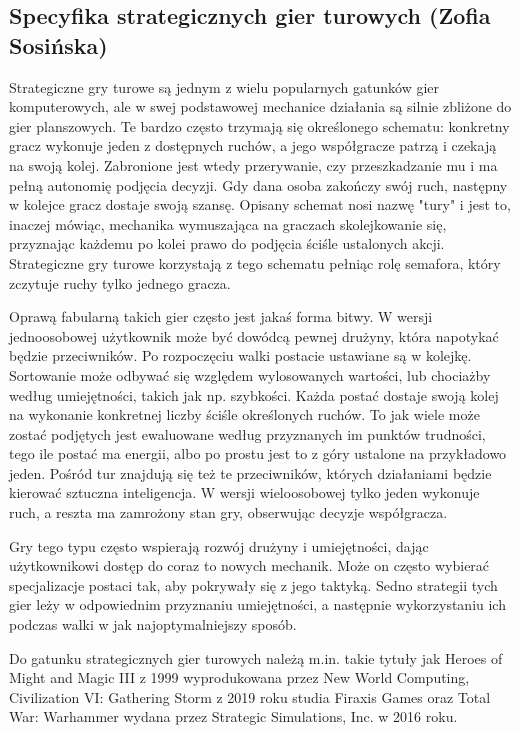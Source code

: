 \subsection{Specyfika strategicznych gier turowych (Zofia Sosińska)}\label{ss:tbs}
Strategiczne gry turowe są jednym z wielu popularnych gatunków gier komputerowych, ale w swej podstawowej mechanice działania są silnie zbliżone do
gier planszowych. Te bardzo często trzymają się określonego schematu: konkretny gracz wykonuje jeden z dostępnych ruchów, a jego współgracze patrzą i czekają 
na swoją kolej. Zabronione jest wtedy przerywanie, czy przeszkadzanie mu i ma pełną autonomię podjęcia decyzji. Gdy dana osoba zakończy swój ruch, następny w kolejce gracz
dostaje swoją szansę. Opisany schemat nosi nazwę "tury" i jest to, inaczej mówiąc, mechanika wymuszająca na graczach skolejkowanie się, przyznając każdemu po kolei
prawo do podjęcia ściśle ustalonych akcji. Strategiczne gry turowe korzystają z tego schematu pełniąc rolę semafora, który zczytuje ruchy tylko jednego gracza.

Oprawą fabularną takich gier często jest jakaś forma bitwy. W wersji jednoosobowej użytkownik może być dowódcą pewnej drużyny, która napotykać będzie przeciwników. Po 
rozpoczęciu walki postacie ustawiane są w kolejkę. Sortowanie może odbywać się względem wylosowanych wartości, lub chociażby według umiejętności, takich jak np. szybkości. Każda postać
 dostaje swoją kolej na wykonanie konkretnej liczby ściśle określonych ruchów. To jak wiele może zostać podjętych jest ewaluowane według przyznanych im punktów 
 trudności, tego ile postać ma energii, albo po prostu jest to z góry ustalone na przykładowo jeden. Pośród tur znajdują się też te przeciwników, których działaniami będzie 
 kierować sztuczna inteligencja. W wersji wieloosobowej tylko jeden wykonuje ruch, a reszta ma zamrożony stan gry, obserwując decyzje współgracza.

Gry tego typu często wspierają rozwój drużyny i umiejętności, dając użytkownikowi dostęp do coraz to nowych mechanik. Może on często wybierać specjalizacje postaci tak, aby 
pokrywały się z jego taktyką. Sedno strategii tych gier leży w odpowiednim przyznaniu umiejętności, a następnie wykorzystaniu ich podczas walki w jak najoptymalniejszy sposób.

Do gatunku strategicznych gier turowych należą m.in. takie tytuły jak Heroes of Might and Magic III z 1999 wyprodukowana przez New World Computing, 
Civilization VI: Gathering Storm z 2019 roku studia Firaxis Games oraz Total War: Warhammer wydana przez Strategic Simulations, Inc. w 2016 roku.
